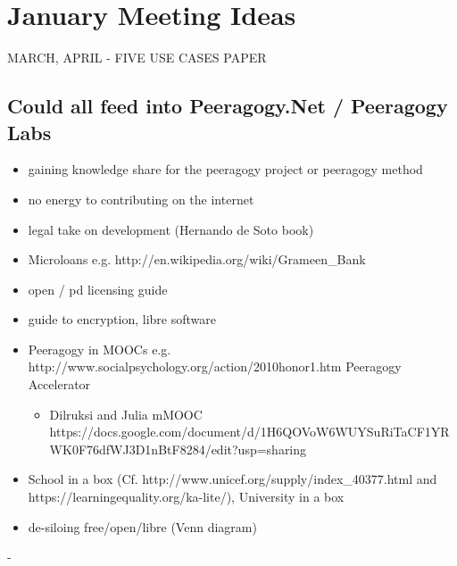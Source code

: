 \section{January Meeting Ideas}

MARCH, APRIL - FIVE USE CASES PAPER

\subsection{Could all feed into Peeragogy.Net / Peeragogy Labs}
\begin{itemize}
\item gaining knowledge share for the peeragogy project or peeragogy method 
\item no energy to contributing on the internet 
\item legal take on development (Hernando de Soto book) 
\item Microloans e.g. http://en.wikipedia.org/wiki/Grameen_Bank 
\item open / pd licensing guide 
\item guide to encryption, libre software 
\item Peeragogy in MOOCs e.g. http://www.socialpsychology.org/action/2010honor1.htm Peeragogy Accelerator 
\begin{itemize}
\item Dilruksi and Julia mMOOC https://docs.google.com/document/d/1H6QOVoW6WUYSuRiTaCF1YRWK0F76dfWJ3D1nBtF8284/edit?usp=sharing
\end{itemize}
\item School in a box (Cf. http://www.unicef.org/supply/index_40377.html and https://learningequality.org/ka-lite/), University in a box
\item de-siloing free/open/libre (Venn diagram)
\end{itemize}
  - 